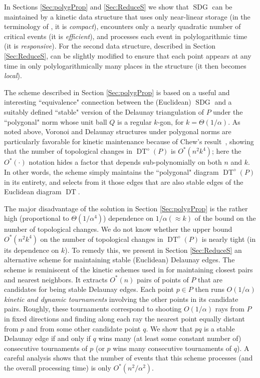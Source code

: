 \documentclass[letter,11pt]{article}
\def\poly{\diamond}
\def\SDG{\mathop{\mathrm{SDG}}}
\def\DT{\mathop{\mathrm{DT}}}
\begin{document}
In Sections \ref{Sec:polygProp} and \ref{Sec:ReduceS} we show that $\SDG$ can be
maintained by a kinetic data structure that uses only near-linear
storage (in the terminology of \cite{bgh-dsmd-99}, it is {\em compact}), 
encounters only a nearly quadratic number of critical events 
(it is {\em efficient}), and processes each event in polylogarithmic 
time (it is {\em responsive}). For the second data structure, described in Section \ref{Sec:ReduceS}, can be slightly modified to ensure that each point appears at any time 
in only polylogarithmically many places in the structure (it then becomes 
{\em local}). 

The scheme described in Section \ref{Sec:polygProp} is based on a useful and interesting ``equivalence" connection
between the (Euclidean) $\SDG$ and a suitably defined ``stable" version of the Delaunay triangulation of $P$ under the ``polygonal" norm whose unit ball $Q$ is a regular
$k$-gon, for $k=\Theta(1/\alpha)$. As noted above, Voronoi and Delaunay structures under polygonal norms are particularly
favorable for kinetic maintenance because of Chew's
result~\cite{Chew}, showing that the number of topological changes in
$\DT^\poly(P)$ is $O^*(n^2k^4)$; here
the $O^*(\cdot)$ notation hides a factor that depends
sub-polynomially on both $n$ and $k$. In other words, the scheme simply maintains the ``polygonal" diagram $\DT^\poly(P)$ in its entirety, and selects from it those edges that are also stable edges of the Euclidean diagram $\DT$.

The major disadvantage of the solution in Section \ref{Sec:polygProp} is
the rather high (proportional to $\Theta(1/\alpha^4)$) dependence on 
$1/\alpha(\approx k)$ of the bound on the number of
topological changes. We do not know whether the upper bound $O^*(n^2k^4)$ on the number of topological changes in
$\DT^\poly(P)$ is nearly tight (in its dependence on $k$). 
To remedy this, we present in Section \ref{Sec:ReduceS} an 
alternative scheme for maintaining stable
(Euclidean) Delaunay edges. The scheme is reminiscent of the kinetic
schemes used in \cite{KineticNeighbors} for maintaining closest pairs
and nearest neighbors. It extracts $O^*(n)$ pairs of points of $P$ 
that are candidates for being stable Delaunay edges. Each point
$p\in P$ then runs $O(1/\alpha)$ \textit{kinetic and dynamic tournaments} involving
the other points in its candidate pairs. Roughly, these tournaments
correspond to shooting $O(1/\alpha)$ rays from $P$ in fixed directions and finding along each ray
the nearest point equally distant from $p$ and from some other
candidate point $q$. We show that $pq$ is a stable Delaunay edge if and
only if $q$ wins many (at least some constant number of) consecutive tournaments of $p$ (or $p$ wins many consecutive tournaments of $q$). A careful analysis shows that
the number of events that this scheme processes (and the overall 
processing time) is only $O^*(n^2/\alpha^2)$.
\end{document}
